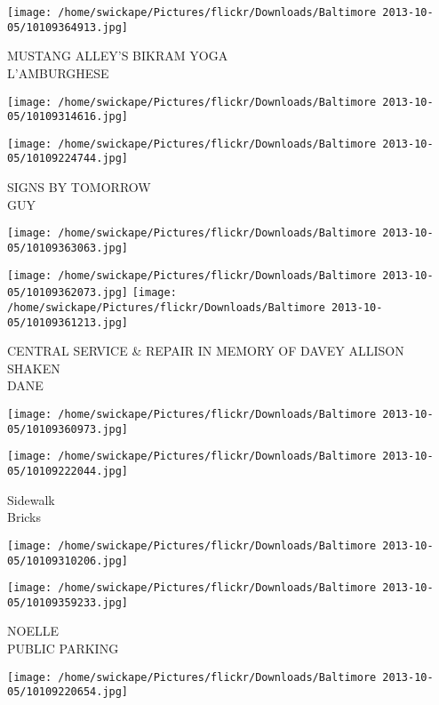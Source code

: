 \documentclass[10pt,letterpaper]{article}
\begin{document}
\vspace{0.25in}
\texttt{[image: /home/swickape/Pictures/flickr/Downloads/Baltimore 2013-10-05/10109364913.jpg]}

MUSTANG ALLEY'S BIKRAM YOGA\\
L'AMBURGHESE
\pagebreak

\texttt{[image: /home/swickape/Pictures/flickr/Downloads/Baltimore 2013-10-05/10109314616.jpg]}

\vspace{0.25in}
\texttt{[image: /home/swickape/Pictures/flickr/Downloads/Baltimore 2013-10-05/10109224744.jpg]}

SIGNS BY TOMORROW\\
GUY
\pagebreak

\texttt{[image: /home/swickape/Pictures/flickr/Downloads/Baltimore 2013-10-05/10109363063.jpg]}

\vspace{0.25in}
\texttt{[image: /home/swickape/Pictures/flickr/Downloads/Baltimore 2013-10-05/10109362073.jpg]}
\texttt{[image: /home/swickape/Pictures/flickr/Downloads/Baltimore 2013-10-05/10109361213.jpg]}

CENTRAL SERVICE \& REPAIR IN MEMORY OF DAVEY ALLISON\\
SHAKEN\\
DANE
\pagebreak

\texttt{[image: /home/swickape/Pictures/flickr/Downloads/Baltimore 2013-10-05/10109360973.jpg]}

\vspace{0.25in}
\texttt{[image: /home/swickape/Pictures/flickr/Downloads/Baltimore 2013-10-05/10109222044.jpg]}

Sidewalk\\
Bricks
\pagebreak

\texttt{[image: /home/swickape/Pictures/flickr/Downloads/Baltimore 2013-10-05/10109310206.jpg]}

\vspace{0.25in}
\texttt{[image: /home/swickape/Pictures/flickr/Downloads/Baltimore 2013-10-05/10109359233.jpg]}

NOELLE\\
PUBLIC PARKING
\pagebreak

\texttt{[image: /home/swickape/Pictures/flickr/Downloads/Baltimore 2013-10-05/10109220654.jpg]}
\end{document}
